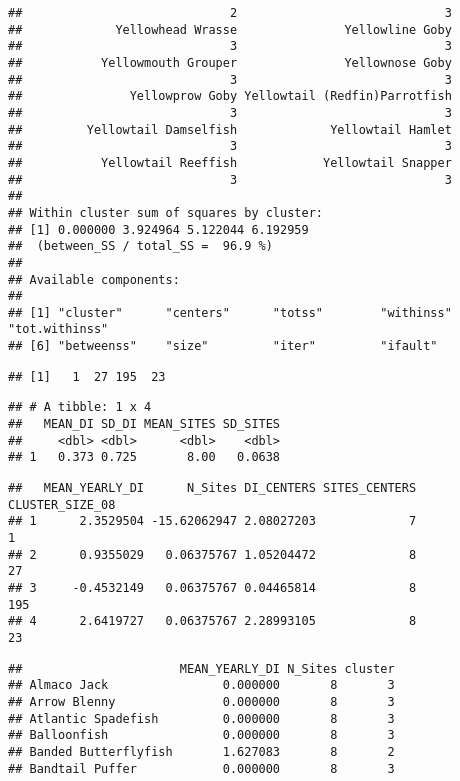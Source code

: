 \documentclass[
]{article}
\begin{document}
\begin{verbatim}
##                             2                             3 
##             Yellowhead Wrasse               Yellowline Goby 
##                             3                             3 
##           Yellowmouth Grouper               Yellownose Goby 
##                             3                             3 
##               Yellowprow Goby Yellowtail (Redfin)Parrotfish 
##                             3                             3 
##         Yellowtail Damselfish             Yellowtail Hamlet 
##                             3                             3 
##           Yellowtail Reeffish            Yellowtail Snapper 
##                             3                             3 
## 
## Within cluster sum of squares by cluster:
## [1] 0.000000 3.924964 5.122044 6.192959
##  (between_SS / total_SS =  96.9 %)
## 
## Available components:
## 
## [1] "cluster"      "centers"      "totss"        "withinss"     "tot.withinss"
## [6] "betweenss"    "size"         "iter"         "ifault"
\end{verbatim}

\begin{verbatim}
## [1]   1  27 195  23
\end{verbatim}

\begin{verbatim}
## # A tibble: 1 x 4
##   MEAN_DI SD_DI MEAN_SITES SD_SITES
##     <dbl> <dbl>      <dbl>    <dbl>
## 1   0.373 0.725       8.00   0.0638
\end{verbatim}

\begin{verbatim}
##   MEAN_YEARLY_DI      N_Sites DI_CENTERS SITES_CENTERS CLUSTER_SIZE_08
## 1      2.3529504 -15.62062947 2.08027203             7               1
## 2      0.9355029   0.06375767 1.05204472             8              27
## 3     -0.4532149   0.06375767 0.04465814             8             195
## 4      2.6419727   0.06375767 2.28993105             8              23
\end{verbatim}

\begin{verbatim}
##                      MEAN_YEARLY_DI N_Sites cluster
## Almaco Jack                0.000000       8       3
## Arrow Blenny               0.000000       8       3
## Atlantic Spadefish         0.000000       8       3
## Balloonfish                0.000000       8       3
## Banded Butterflyfish       1.627083       8       2
## Bandtail Puffer            0.000000       8       3
\end{verbatim}
\end{document}
